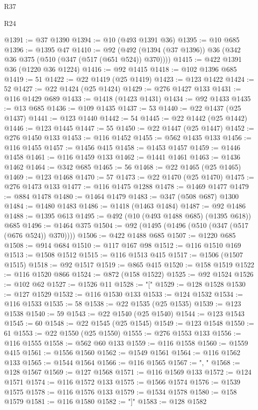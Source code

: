 \begin{lexlean}{R37}
\begin{lexlean}{R24}
\begin{coremodule}
{{{{{{{{{{{{{{{{{{{{{{{{{{{{{{{{{{{{{{{{{{{{{{{{{{{{{{{{{{{{{{{{{{{{{{{{{{{{{{{{{{{{{{{{{{{{{{{{{{{{{{{{{{{{{{{{{{{{{{{{{{{{{{{{{{{{{{{{{{{{{{{{{{{{{{{{{{{{{{{{{{{{{{{{{{{{{{{{{{{{{{{{{@1391 := @37 @1390
@1394 := @10 (@493 @1391 @36)
@1395 := @10 @685
@1396 := @1395 @47
@1410 := @92 (@492 (@1394 (@37 @1396)) @36 (@342 @36 @375 (@510 (@347 (@517 (@651 @524)) @370))))
@1415 := @422 @1391 @36 (@1220 @36 @1224)
@1416 := @92 @1415
@1418 := @102 @1396 @685
@1419 := 51
@1422 := @22 @1419 (@25 @1419)
@1423 := @123 @1422
@1424 := 52
@1427 := @22 @1424 (@25 @1424)
@1429 := @276 @1427 @133
@1431 := @116 @1429 @689
@1433 := @1418 (@1423 @1431)
@1434 := @92 @1433
@1435 := @13 @685
@1436 := @109 @1435
@1437 := 53
@1440 := @22 @1437 (@25 @1437)
@1441 := @123 @1440
@1442 := 54
@1445 := @22 @1442 (@25 @1442)
@1446 := @123 @1445
@1447 := 55
@1450 := @22 @1447 (@25 @1447)
@1452 := @276 @1450 @133
@1453 := @116 @1452
@1455 := @562 @1435 @133
@1456 := @116 @1455
@1457 := @1456 @415
@1458 := @1453 @1457
@1459 := @1446 @1458
@1461 := @116 @1459 @133
@1462 := @1441 @1461
@1463 := @1436 @1462
@1464 := @342 @685
@1465 := 56
@1468 := @22 @1465 (@25 @1465)
@1469 := @123 @1468
@1470 := 57
@1473 := @22 @1470 (@25 @1470)
@1475 := @276 @1473 @133
@1477 := @116 @1475 @1288
@1478 := @1469 @1477
@1479 := @884 @1478
@1480 := @1464 @1479
@1483 := @347 (@508 @687) @1300
@1484 := @1480 @1483
@1486 := @1418 (@1463 @1484)
@1487 := @92 @1486
@1488 := @1395 @613
@1495 := @492 (@10 (@493 @1488 @685) (@1395 @618)) @685
@1496 := @1464 @375
@1504 := @92 (@1495 (@1496 (@510 (@347 (@517 (@676 @524)) @370))))
@1506 := @422 @1488 @685
@1507 := @1220 @685
@1508 := @914 @684
@1510 := @117 @167 @98
@1512 := @116 @1510 @169
@1513 := @1508 @1512
@1515 := @116 @1513 @415
@1517 := @1506 (@1507 @1515)
@1518 := @92 @1517
@1519 := @865 @415
@1520 := @158 @1519
@1522 := @116 @1520 @866
@1524 := @872 (@158 @1522)
@1525 := @92 @1524
@1526 := @102 @62
@1527 := @1526 @11
@1528 := "["
@1529 := @128 @1528
@1530 := @127 @1529
@1532 := @116 @1530 @133
@1533 := @124 @1532
@1534 := @116 @1533
@1535 := 58
@1538 := @22 @1535 (@25 @1535)
@1539 := @123 @1538
@1540 := 59
@1543 := @22 @1540 (@25 @1540)
@1544 := @123 @1543
@1545 := 60
@1548 := @22 @1545 (@25 @1545)
@1549 := @123 @1548
@1550 := 61
@1553 := @22 @1550 (@25 @1550)
@1555 := @276 @1553 @133
@1556 := @116 @1555
@1558 := @562 @60 @133
@1559 := @116 @1558
@1560 := @1559 @415
@1561 := @1556 @1560
@1562 := @1549 @1561
@1564 := @116 @1562 @133
@1565 := @1544 @1564
@1566 := @116 @1565
@1567 := ", "
@1568 := @128 @1567
@1569 := @127 @1568
@1571 := @116 @1569 @133
@1572 := @124 @1571
@1574 := @116 @1572 @133
@1575 := @1566 @1574
@1576 := @1539 @1575
@1578 := @116 @1576 @133
@1579 := @1534 @1578
@1580 := @158 @1579
@1581 := @116 @1580
@1582 := "]"
@1583 := @128 @1582
}}}}}}}}}}}}}}}}}}}}}}}}}}}}}}}}}}}}}}}}}}}}}}}}}}}}}}}}}}}}}}}}}}}}}}}}}}}}}}}}}}}}}}}}}}}}}}}}}}}}}}}}}}}}}}}}}}}}}}}}}}}}}}}}}}}}}}}}}}}}}}}}}}}}}}}}}}}}}}}}}}}}}}}}}}}}}}}}}}}}}}}}}
\end{coremodule}
\end{lexlean}
\end{lexlean}
